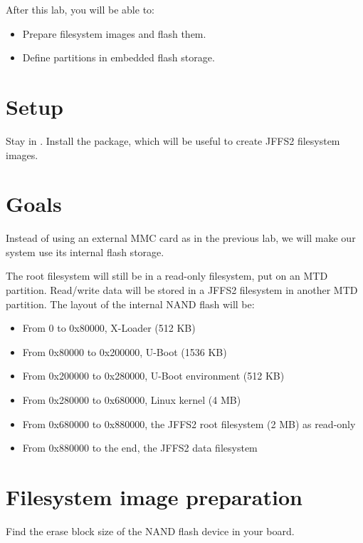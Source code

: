 
After this lab, you will be able to:
\begin{itemize}
\item Prepare filesystem images and flash them.
\item Define partitions in embedded flash storage.
\end{itemize}

\section{Setup}

Stay in . Install the
 package, which will be useful to create JFFS2
filesystem images.

\section{Goals}

Instead of using an external MMC card as in the previous lab, we will
make our system use its internal flash storage.

The root filesystem will still be in a read-only filesystem, put on an
MTD partition.  Read/write data will be stored in a JFFS2 filesystem
in another MTD partition. The layout of the internal NAND flash will
be:

\begin{itemize}
\item From 0 to 0x80000, X-Loader (512 KB)
\item From 0x80000 to 0x200000, U-Boot (1536 KB)
\item From 0x200000 to 0x280000, U-Boot environment (512 KB)
\item From 0x280000 to 0x680000, Linux kernel (4 MB)
\item From 0x680000 to 0x880000, the JFFS2 root filesystem (2 MB) as read-only
\item From 0x880000 to the end, the JFFS2 data filesystem
\end{itemize}

\section{Filesystem image preparation}

Find the erase block size of the NAND flash device in your board.

